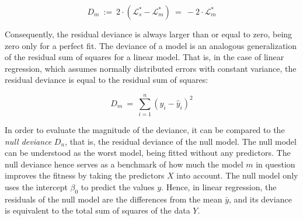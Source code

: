 \begin{equation}
    \label{sec:Factorization:sub:GLM:eq:deviance}
    D_m ~:=~ 2 \cdot ( \mathcal{L}^*_s - \mathcal{L}^*_m ) ~=~ -2 \cdot \mathcal{L}^*_m
\end{equation}

Consequently, the residual deviance is always larger than or equal to zero, being zero only for a perfect fit.
The deviance of a model is an analogous generalization of the residual sum of squares for a linear model.
That is, in the case of linear regression, which assumes normally distributed errors with constant variance,
the residual deviance is equal to the residual sum of squares: %

\begin{equation}
    \label{sec:Factorization:sub:GLM:eq:regression}
    D_m ~=~ \sum_{i=1}^{n} \left( y_i - \hat{y}_i \right)^2
\end{equation}


In order to evaluate the magnitude of the deviance, it can be compared to the \emph{null deviance} $D_n$,
that is, the residual deviance of the null model.
The null model can be understood as the worst model, being fitted without any predictors.
The null deviance hence serves as a benchmark of how much the model $m$ in question
improves the fitness by taking the predictors $X$ into account.
The null model only uses the intercept $\beta_0$ to predict the values $y$. %
Hence, in linear regression, the residuals of the null model are the differences from the mean $\bar{y}$,
and its deviance is equivalent to the total sum of squares of the data $Y$.

